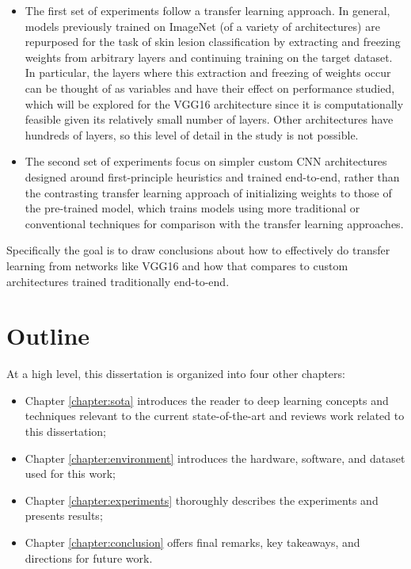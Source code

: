 \begin{itemize}
    \item The first set of experiments follow a transfer learning approach. In general, models previously trained on ImageNet (of a variety of architectures) are repurposed for the task of skin lesion classification by extracting and freezing weights from arbitrary layers and continuing training on the target dataset. In particular, the layers where this extraction and freezing of weights occur can be thought of as variables and have their effect on performance studied, which will be explored for the VGG16 architecture since it is computationally feasible given its relatively small number of layers. Other architectures have hundreds of layers, so this level of detail in the study is not possible.
    \item The second set of experiments focus on simpler custom \ac{CNN} architectures designed around first-principle heuristics and trained end-to-end, rather than the contrasting transfer learning approach of initializing weights to those of the pre-trained model, which trains models using more traditional or conventional techniques for comparison with the transfer learning approaches.
\end{itemize}

Specifically the goal is to draw conclusions about how to effectively do transfer learning from networks like VGG16 and how that compares to custom architectures trained traditionally end-to-end.

\section{Outline}

At a high level, this dissertation is organized into four other chapters:

\begin{itemize}
    \item Chapter \ref{chapter:sota} introduces the reader to deep learning concepts and techniques relevant to the current state-of-the-art and reviews work related to this dissertation;
    \item Chapter \ref{chapter:environment} introduces the hardware, software, and dataset used for this work;
    \item Chapter \ref{chapter:experiments} thoroughly describes the experiments and presents results;
    \item Chapter \ref{chapter:conclusion} offers final remarks, key takeaways, and directions for future work.
\end{itemize}
